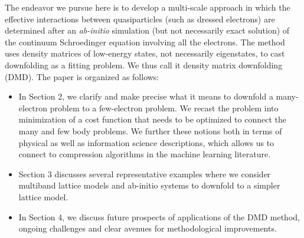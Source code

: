 The endeavor we pursue here is to develop a multi-scale approach in which the effective interactions between quasiparticles (such as dressed electrons) are determined after an \textit{ab-initio} simulation (but not necessarily exact solution) of the continuum Schroedinger equation involving all the electrons. 
The method uses density matrices of low-energy states, not necessarily eigenstates, to cast downfolding as a fitting problem.
We thus call it density matrix downfolding (DMD).
The paper is organized as follows:
\begin{itemize} 
\item 	In Section 2, we clarify and make precise what it means to downfold 
a many-electron problem to a few-electron problem. We recast the problem into minimization 
of a cost function that needs to be optimized to connect the many and few body problems. We further 
these notions both in terms of physical as well as information science descriptions, which allows us to connect to compression algorithms in the machine learning literature. 
\item Section 3 discusses several representative examples where we consider multiband lattice models 
and ab-initio systems to downfold to a simpler lattice model. 
\item In Section 4, we discuss future prospects of applications of the DMD method, ongoing challenges 
and clear avenues for methodological improvements. 
\end{itemize}


